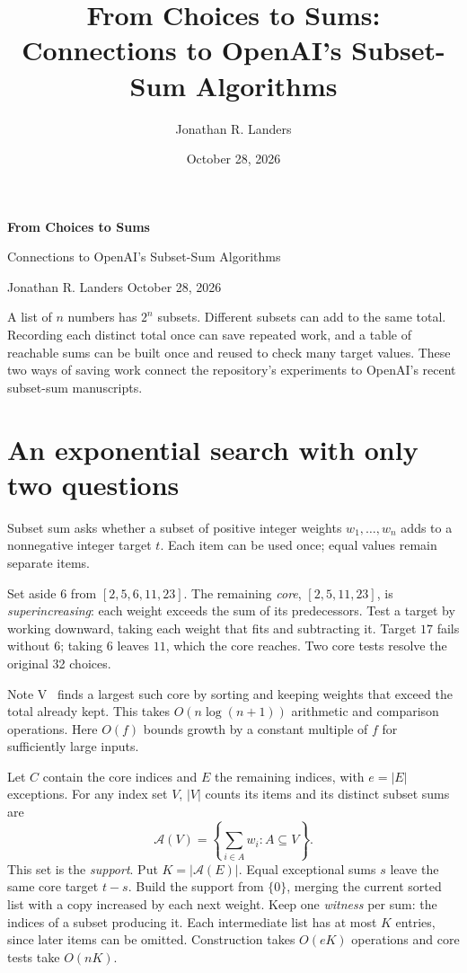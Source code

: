 \documentclass[11pt,english]{article}
\title{From Choices to Sums: Connections to OpenAI's Subset-Sum Algorithms}
\author{Jonathan R. Landers}
\date{October 28, 2026}
\begin{document}
{\LARGE\sffamily\bfseries From Choices to Sums}\par
\vspace{3pt}
{\large\sffamily Connections to OpenAI's Subset-Sum Algorithms}\par
\vspace{6pt}
{\small Jonathan R. Landers \hfill October 28, 2026}\par

\begin{tcolorbox}[accentbox]
A list of $n$ numbers has $2^n$ subsets. Different subsets can add to the same
total. Recording each distinct total once can save repeated work, and a table
of reachable sums can be built once and reused to check many target values.
These two ways of saving work connect the repository's experiments to
OpenAI's recent subset-sum manuscripts.
\end{tcolorbox}

\section{An exponential search with only two questions}
Subset sum asks whether a subset of positive integer weights $w_1,\ldots,w_n$
adds to a nonnegative integer target $t$. Each item can be used once; equal
values remain separate items.

Set aside $6$ from $[2,5,6,11,23]$. The remaining \emph{core}, $[2,5,11,23]$,
is \emph{superincreasing}: each weight exceeds the sum of its predecessors.
Test a target by working downward, taking each weight that fits and subtracting
it. Target $17$ fails without $6$; taking $6$ leaves $11$, which the core reaches.
Two core tests resolve the original 32 choices.

Note V~\cite{v} finds a largest such core by sorting and keeping weights that
exceed the total already kept. This takes $O(n\log(n+1))$ arithmetic and
comparison operations. Here $O(f)$ bounds growth by a constant multiple of
$f$ for sufficiently large inputs.

Let $C$ contain the core indices and $E$ the remaining indices, with $e=|E|$
exceptions. For any index set $V$, $|V|$ counts its items and its distinct subset sums are
\[
 \mathcal A(V)=\left\{\sum_{i\in A}w_i:A\subseteq V\right\}.
\]
This set is the \emph{support}. Put $K=|\mathcal A(E)|$. Equal exceptional
sums $s$ leave the same core target $t-s$. Build the support from $\{0\}$,
merging the current sorted list with a copy increased by each next weight.
Keep one \emph{witness} per sum: the indices of a subset producing it.
Each intermediate list has at most $K$ entries, since later items can be
omitted. Construction takes $O(eK)$ operations and core tests take $O(nK)$.
\end{document}
